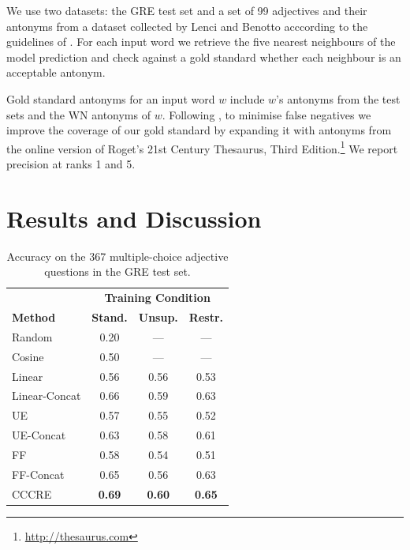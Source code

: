 \documentclass[11pt]{article}
\begin{document}
We use two datasets: the GRE test set and a set of 99 adjectives and their
antonyms from a dataset collected by Lenci and Benotto
acccording to the guidelines of \citet{walde:13}. For each input word we retrieve the five nearest neighbours of the model prediction and check against a gold standard whether each neighbour is an acceptable antonym.

Gold standard antonyms for an input word $w$ include $w$'s antonyms from the test sets and the WN antonyms of $w$. Following \citet{gorman:05}, to minimise false negatives we improve the coverage of our gold standard by expanding it with antonyms from the online version of Roget's 21st Century Thesaurus, Third
Edition.\footnote{\url{http://thesaurus.com}} We report precision at
ranks 1 and 5.


\section{Results and Discussion}
\begin{table}[t!]
\begin{tabular}{lccc}
 & \multicolumn{3}{c}{\bf Training Condition} \\
\bf Method & \bf Stand. & \bf Unsup. & \bf Restr. \\
\hline
\hline
Random & 0.20 & --- & --- \\
Cosine & 0.50 & --- & --- \\
\hline
Linear & 0.56 & 0.56 & 0.53 \\
Linear-Concat & 0.66 & 0.59 & 0.63 \\
\hline
UE & 0.57 & 0.55 & 0.52 \\
UE-Concat & 0.63 & 0.58 & 0.61 \\
FF & 0.58 & 0.54 & 0.51 \\
FF-Concat & 0.65 & 0.56 & 0.63 \\
\hline
CCCRE & \bf 0.69 & \bf 0.60 & \bf 0.65 \\
\end{tabular} 
\caption{Accuracy on the 367 multiple-choice adjective questions in the GRE test set.}
\label{t:gre}
\end{table}
\end{document}
